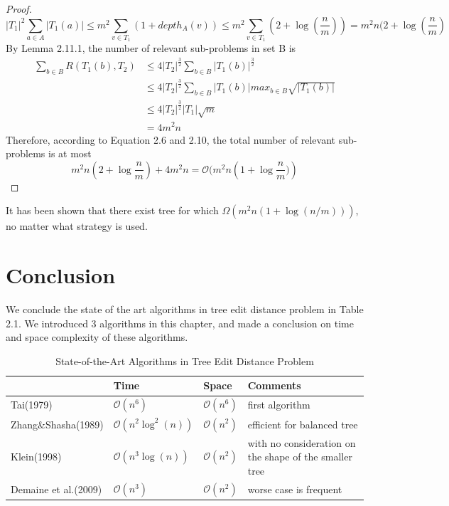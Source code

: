 \begin{proof}
\begin{equation}
\left\vert T_1 \right\vert^2\sum_{a \in A}\left\vert T_1(a) \right\vert \leq m^2\sum_{v \in T_1}(1 + depth_A(v)) \leq m^2\sum_{v \in T_1}(2 + \log(\frac{n}{m}))=m^2n(2 + \log(\frac{n}{m})
\end{equation}
By Lemma 2.11.1, the number of relevant sub-problems in set B is 
\begin{align}
\sum_{b \in B}R(T_1(b), T_2) &\leq 4\left\vert T_2 \right\vert^{\frac{3}{2}}\sum_{b \in B}\left\vert T_1(b) \right\vert^{\frac{3}{2}}\\
& \leq 4\left\vert T_2 \right\vert^{\frac{3}{2}}\sum_{b \in B}\left\vert T_1(b) \right\vert max_{b \in B}\sqrt{\left\vert T_1(b) \right\vert}\\
& \leq 4\left\vert T_2 \right\vert^{\frac{3}{2}}\left\vert T_1\right\vert \sqrt{m}\\
&=4m^2n
\end{align}
Therefore, according to Equation 2.6 and 2.10, the total number of relevant sub-problems is at most 
\begin{equation*}
m^2n(2 + \log{\frac{n}{m}}) + 4m^2n = \mathcal{O}(m^2n(1 + \log{\frac{n}{m})})
\end{equation*}
\end{proof}

\begin{remark}
It has been shown that there exist tree for which $\Omega(m^2n(1+\log(n/m)))$, no matter what strategy is used.~\cite{demaine2009optimal}
\end{remark}

\section{Conclusion}
We conclude the state of the art algorithms in tree edit distance problem in Table 2.1. We introduced 3 algorithms in this chapter, and made a conclusion on time and space complexity of these algorithms. 
\begin{table}
			\centering
			\begin{tabular}{l l l l}
				\toprule
				\textbf{} & \textbf{Time} & \textbf{Space} & \textbf{Comments}\\

				\midrule
				Tai(1979) &  $\mathcal{O}(n^6)$ & $\mathcal{O}(n^6)$ & first algorithm\\
				Zhang\&Shasha(1989) & $\mathcal{O}(n^2\log^2(n))$ & $\mathcal{O}(n^2)$ & efficient for balanced tree \\
				Klein(1998) &  $\mathcal{O}(n^3\log(n))$ & $\mathcal{O}(n^2)$ & with no consideration on the shape of the smaller tree\\
				Demaine et al.(2009) &  $\mathcal{O}(n^3)$ & $\mathcal{O}(n^2)$ & worse case is frequent\\
			\end{tabular}
		\caption{State-of-the-Art Algorithms in Tree Edit Distance Problem}
\end{table}

